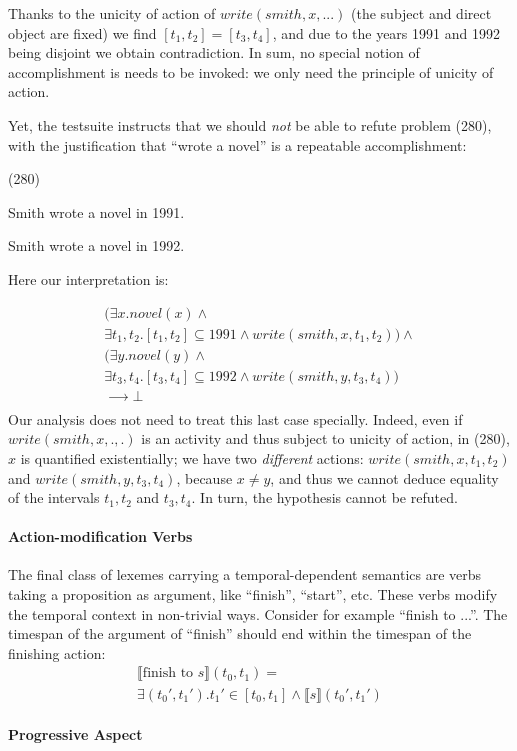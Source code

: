 \documentclass[11pt,a4paper]{article}
\newcommand\hyp{\item[H]}
\newcommand\fracasex[2]{\begin{lingex}\item[(#1)] \begin{subex} #2 \end{subex} \end{lingex} }
\begin{document}
Thanks to the unicity of action of $write(smith,x,...)$ (the subject
and direct object are fixed) we find \([t_1,t_2] = [t_3,t_4]\), and
due to the years 1991 and 1992 being disjoint we obtain contradiction. In sum, no special notion of accomplishment is needs to be invoked: we only need the principle of unicity of action.

Yet, the testsuite instructs that we should \emph{not} be able to refute
problem (280), with the justification that ``wrote a novel'' is a repeatable
accomplishment:

\fracasex{280}{
\item	Smith wrote a novel in 1991.
\hyp 	Smith wrote a novel in 1992.
}
Here our interpretation is:

\[\begin{array}{l}
(∃x. novel(x) ∧ \\
∃t_1,t_2. [t_1,t_2] ⊆ 1991 ∧ write(smith,x,t_1,t_2)) ∧ \\
(∃y. novel(y) ∧ \\
∃t_3,t_4. [t_3,t_4] ⊆ 1992 ∧ write(smith,y,t_3,t_4)) \\
⟶ ⊥ \\
\end{array}
\]
Our analysis does not need to treat this last case specially. Indeed,
even if $write(smith,x,.,.)$ is an activity and thus subject to
unicity of action, in (280), $x$ is quantified existentially; we have
two \emph{different} actions: $write(smith,x,t_1,t_2)$ and
$write(smith,y,t_3,t_4)$, because $x \neq y$, and thus we cannot
deduce equality of the intervals $t_1,t_2$ and $t_3,t_4$. In turn, the
hypothesis cannot be refuted.

\paragraph{Action-modification Verbs}

The final class of lexemes carrying a temporal-dependent semantics are
verbs taking a proposition as argument, like ``finish'', ``start'',
etc. These verbs modify the temporal context in non-trivial
ways. Consider for example ``finish to ...''. The timespan of the
argument of ``finish'' should end within the timespan of the finishing
action:
%
\begin{multline*}
⟦\text{finish to \(s\)}⟧(t_0,t_1) = \\ ∃(t_0',t_1'). t_1' ∈ [t_0,t_1] ∧ ⟦s⟧(t_0',t_1')
\end{multline*}

\paragraph{Progressive Aspect}
\end{document}
